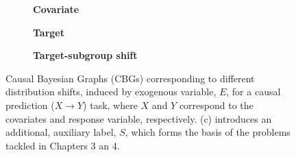 \begin{figure}[]
        \centering
        \begin{subfigure}[t]{0.3\textwidth}
            \centering
            \caption{\textbf{Covariate}}
        \end{subfigure}
        \begin{subfigure}[t]{0.3\textwidth}
            \centering
            \caption{\textbf{Target}}
        \end{subfigure}
        \begin{subfigure}[t]{0.3\textwidth}
            \centering
            \caption{\textbf{Target-subgroup shift}}
        \end{subfigure}
    \caption{
        Causal Bayesian Graphs (CBGs) corresponding to different distribution shifts, induced by
        exogenous variable, \(E\), for a causal prediction (\(X \to Y \)) task, where \(X\) and
        \(Y\) correspond to the covariates and response variable, respectively.
        (c) introduces an additional, auxiliary label, \(S\), which forms the basis of the problems
        tackled in Chapters 3 an 4.
    }
    \label{fig:ds_cbgs}
\end{figure}

